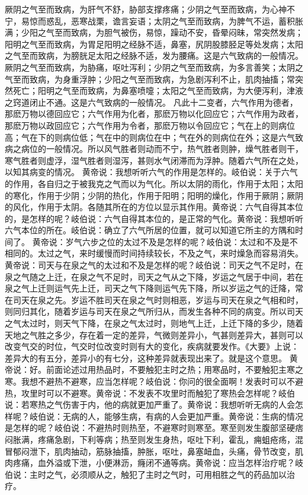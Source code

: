\documentclass[12pt,UTF8]{ctexbook}
\begin{document}
厥阴之气至而致病，为肝气不舒，胁部支撑疼痛；少阴之气至而致病，为心神不宁，易惊而惑乱，恶寒战栗，谵言妄语；太阴之气至而致病，为脾气不运，蓄积胀满；少阳之气至而致病，为胆气被伤，易惊，躁动不安，昏晕闷昧，常突然发病；阳明之气至而致病，为胃足阳明之经脉不适，鼻塞，尻阴股膝胫足等处发病；太阳之气至而致病，为膀胱足太阳之经脉不适，发为腰痛。这是六气致病的一般情况。
厥阴之气至而致病，为胁痛，呕吐泻利；少阴之气至而致病，为多言善笑；太阴之气至而致病，为身重浮肿；少阳之气至而致病，为急剧泻利不止，肌肉抽搐；常突然死亡；阳明之气至而致病，为鼻塞喷嚏；太阳之气至而致病，为大便泻利，津液之窍道闭止不通。这是六气致病的一般情况。
凡此十二变者，六气作用为德者，那麽万物以德回应它；六气作用为化者，那麽万物以化回应它；六气作用为政者，那麽万物以政回应它；六气作用为令者，那麽万物以令回应它；气在上的则病位高；气在下的则病位低；气在中的则病位在中；气在外的则病位在外；这是六气致病之病位的一般情况。所以风气胜者则动而不宁，热气胜者则肿，燥气胜者则干，寒气胜者则虚浮，湿气胜者则湿泻，甚则水气闭滞而为浮肿。随着六气所在之处，以知其病变的情况。
黄帝说：我想听听六气的作用是怎样的。岐伯说：关于六气的作用，各自归之于被我克之气而以为气化。所以太阴的雨化，作用于太阳；太阳的寒化，作用于少阴；少阴的热化，作用于阳明；阳明的燥化，作用于厥阴；厥阴的风化，作用于太阴。各随其所在的方位以显示其作用。黄帝说：六气自得其本位的，是怎样的呢？岐伯说：六气自得其本位的，是正常的气化。黄帝说：我想听听六气本位的所在。岐伯说：确立了六气所居的位置，就可以知道它所主的方隅和时间了。
黄帝说：岁气六步之位的太过不及是怎样的呢？岐伯说：太过和不及是不相同的。太过之气，来时缓慢而时间持续较长，不及之气，来时燥急而容易消失。黄帝说：司天与在泉之气的太过和不及是怎样的呢？岐伯说：司天之气不足时，在泉之气随之上迁，在泉之气不足时，司天之气从之下降，岁运之气居于中间，若在泉之气上迁则运气先上迁，司天之气下降则运气先下降，所以岁运之气的迁降，常在司天在泉之先。岁运不胜司天在泉之气时则相恶，岁运与司天在泉之气相和时，则同归其化，随着岁运与司天在泉之气所归从，而发生各种不同的病变。所以司天之气太过时，则天气下降，在泉之气太过时，则地气上迁，上迁下降的多少，随着天地之气胜之多少，存在着一定的差异，气微则差异小，气甚则差异大，甚则可以改变气交的时位，气交时位改变时则有大的变化，疾病就要发作。《大要》上说：差异大的有五分，差异小的有七分，这种差异就表现出来了。就是这个意思。
黄帝说：好。前面论述过用热品时，不要触犯主时之热；用寒品时，不要触犯主寒之寒。我想不避热不避寒，应当怎样呢？岐伯说：你问的很全面啊！发表时可以不避热，攻里时可以不避寒。黄帝说：不发表不攻里时而触犯了寒热会怎样呢？岐伯说：若寒热之气伤害于内，他的病就更加严重了。黄帝说：我想听听无病的人会怎样呢？岐伯说：无病的人，能够生病，有病的人会更加严重。黄帝说：生病的情况是怎样的呢？岐伯说：不避热时则热至，不避寒时则寒至。寒至则发生腹部坚硬痞闷胀满，疼痛急剧，下利等病；热至则发生身热，呕吐下利，霍乱，痈蛆疮疡，混冒郁闷泄下，肌肉抽动，筋脉抽搐，肿胀，呕吐，鼻塞衄血，头痛，骨节改变，肌肉疼痛，血外溢或下泄，小便淋沥，癃闭不通等病。黄帝说：应当怎样治疗呢？岐伯说：主时之气，必须顺从之，触犯了主时之气时，可用相胜之气的药品加以治疗。
\end{document}
